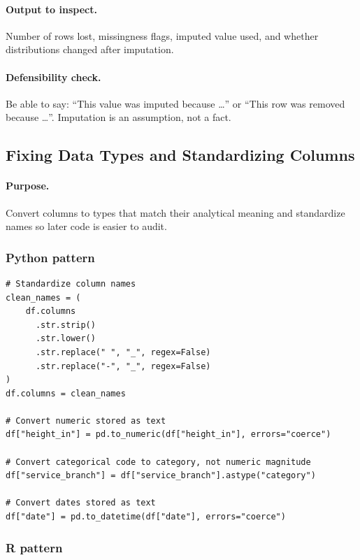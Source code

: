 \paragraph{Output to inspect.} Number of rows lost, missingness flags, imputed value used, and whether distributions changed after imputation.

\paragraph{Defensibility check.} Be able to say: ``This value was imputed because \ldots{}'' or ``This row was removed because \ldots{}''.  Imputation is an assumption, not a fact.

\subsection{Fixing Data Types and Standardizing Columns}
\label{app:ch03-software-cookbook-types-names}

\paragraph{Purpose.} Convert columns to types that match their analytical meaning and standardize names so later code is easier to audit.

\subsubsection*{Python pattern}

\begin{verbatim}
# Standardize column names
clean_names = (
    df.columns
      .str.strip()
      .str.lower()
      .str.replace(" ", "_", regex=False)
      .str.replace("-", "_", regex=False)
)
df.columns = clean_names

# Convert numeric stored as text
df["height_in"] = pd.to_numeric(df["height_in"], errors="coerce")

# Convert categorical code to category, not numeric magnitude
df["service_branch"] = df["service_branch"].astype("category")

# Convert dates stored as text
df["date"] = pd.to_datetime(df["date"], errors="coerce")
\end{verbatim}

\subsubsection*{R pattern}

